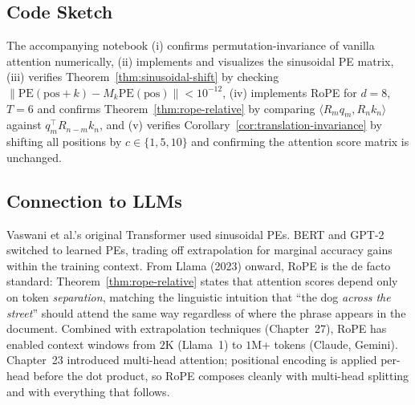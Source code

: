 \subsection*{Code Sketch}

The accompanying notebook (i) confirms permutation-invariance of vanilla attention numerically, (ii) implements and visualizes the sinusoidal PE matrix, (iii) verifies Theorem~\ref{thm:sinusoidal-shift} by checking $\|\mathrm{PE}(\mathrm{pos}+k) - M_k \mathrm{PE}(\mathrm{pos})\| < 10^{-12}$, (iv) implements RoPE for $d=8$, $T=6$ and confirms Theorem~\ref{thm:rope-relative} by comparing $\langle R_m q_m, R_n k_n \rangle$ against $q_m^{\top} R_{n-m} k_n$, and (v) verifies Corollary~\ref{cor:translation-invariance} by shifting all positions by $c \in \{1, 5, 10\}$ and confirming the attention score matrix is unchanged.

\subsection*{Connection to LLMs}

Vaswani et al.'s original Transformer used sinusoidal PEs. BERT and GPT-2 switched to learned PEs, trading off extrapolation for marginal accuracy gains within the training context. From Llama (2023) onward, RoPE is the de facto standard: Theorem~\ref{thm:rope-relative} states that attention scores depend only on token \emph{separation}, matching the linguistic intuition that ``the dog \emph{across the street}'' should attend the same way regardless of where the phrase appears in the document. Combined with extrapolation techniques (Chapter~27), RoPE has enabled context windows from $2$K (Llama~1) to $1$M+ tokens (Claude, Gemini). Chapter~23 introduced multi-head attention; positional encoding is applied per-head before the dot product, so RoPE composes cleanly with multi-head splitting and with everything that follows.
